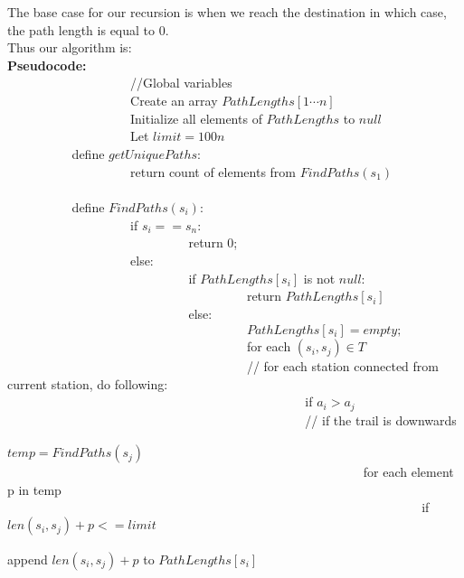 \documentclass[12pt]{article}
\begin{document}
\begin{enumerate}
\begin{enumerate}
\begin{enumerate}
The base case for our recursion is when we reach the destination in which case, the path length is equal to 0.\\
Thus our algorithm is:\\
\textbf{Pseudocode:}\\
\verb|			|\verb|			|//Global variables\\
\verb|			|\verb|			|Create an array $PathLengths[1 \cdots n]$ \\
\verb|			|\verb|			|Initialize all elements of $PathLengths$ to $null$\\
\verb|			|\verb|			|Let $limit = 100n$\\

\verb|			|define $getUniquePaths$:\\
\verb|			|\verb|			|return count of elements from $FindPaths(s_1)$\\
\\
\verb|			|define $FindPaths(s_i):$\\
\verb|			|\verb|			|if $s_i == s_n:$\\
\verb|			|\verb|			|\verb|			|return 0;\\
\verb|			|\verb|			|else:\\
\verb|			|\verb|			|\verb|			|if $PathLengths[s_i]$ is not $null$:\\
\verb|			|\verb|			|\verb|			|\verb|			|return $PathLengths[s_i]$\\
\verb|			|\verb|			|\verb|			|else:\\
\verb|			|\verb|			|\verb|			|\verb|			|$PathLengths[s_i] = empty;$\\
\verb|			|\verb|			|\verb|			|\verb|			|for each $(s_i,s_j) \in T$ \\
\verb|			|\verb|			|\verb|			|\verb|			|// for each station connected from current station, do following:\\ 
\verb|			|\verb|			|\verb|			|\verb|			|\verb|			|if  $a_i > a_j$ \\
\verb|			|\verb|			|\verb|			|\verb|			|\verb|			|// if the trail is downwards\\
\verb|			|\verb|			|\verb|			|\verb|			|\verb|			|\verb|			| $temp = FindPaths(s_j)$\\
\verb|			|\verb|			|\verb|			|\verb|			|\verb|			|\verb|			|for each element p in temp\\
\verb|			|\verb|			|\verb|			|\verb|			|\verb|			|\verb|			|\verb|			|if $len(s_i,s_j) + p <= limit$\\
\verb|			|\verb|			|\verb|			|\verb|			|\verb|			|\verb|			|\verb|			|\verb|			|append $len(s_i,s_j) + p$ to $PathLengths[s_i]$\\

\end{enumerate}
\end{enumerate}
\end{enumerate}
\end{document}
